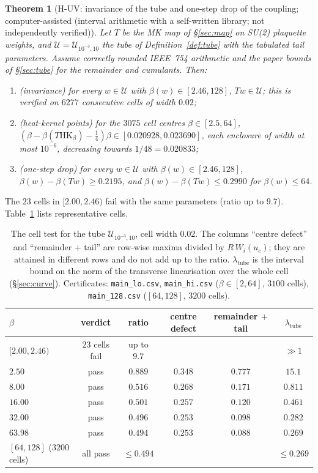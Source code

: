 \documentclass[11pt,a4paper]{article}
\newtheorem{theorem}{Theorem}[section]
\theoremstyle{definition}
\theoremstyle{remark}
\newcommand{\code}[1]{\texttt{#1}}
\newcommand{\HK}{\mathrm{HK}}
\newcommand{\cU}{\mathcal{U}}
\newcommand{\IA}{computer-assisted (interval arithmetic with a self-written library; not independently verified)}
\begin{document}
\begin{theorem}[H-UV: invariance of the tube and one-step drop of the coupling; \IA]\label{thm:huv}
Let $T$ be the MK map of \S\ref{sec:map} on SU(2) plaquette weights, and $\cU=\cU_{10^{-3},10}$ the tube of Definition~\ref{def:tube} with the tabulated tail parameters.
Assume correctly rounded IEEE~754 arithmetic and the paper bounds of \S\ref{sec:tube} for the remainder and cumulants.
Then:
\begin{enumerate}[label=(\roman*)]
\item (invariance) for every $w\in\cU$ with $\beta(w)\in[2.46,128]$, $Tw\in\cU$; this is verified on $6277$ consecutive cells of width $0.02$;
\item (heat-kernel points) for the $3075$ cell centres $\beta\in[2.5,64]$, $(\beta-\beta(T\HK_\beta)-\tfrac14)\beta\in[0.020928,0.023690]$, each enclosure of width at most $10^{-6}$, decreasing towards $1/48=0.020833$;
\item (one-step drop) for every $w\in\cU$ with $\beta(w)\in[2.46,128]$, $\beta(w)-\beta(Tw)\ge0.2195$, and $\beta(w)-\beta(Tw)\le0.2990$ for $\beta(w)\le64$.
\end{enumerate}
\end{theorem}
The $23$ cells in $[2.00,2.46)$ fail with the same parameters (ratio up to $9.7$).
Table~\ref{tab:cells} lists representative cells.

\begin{table}[ht]\centering\small
\begin{tabular}{lccccc}
\toprule
$\beta$ & verdict & ratio & centre defect & remainder $+$ tail & $\lambda_{\mathrm{tube}}$ \\
\midrule
$[2.00,2.46)$ & $23$ cells fail & up to $9.7$ & & & $\gg1$ \\
$2.50$ & pass & $0.889$ & $0.348$ & $0.777$ & $15.1$ \\
$8.00$ & pass & $0.516$ & $0.268$ & $0.171$ & $0.811$ \\
$16.00$ & pass & $0.501$ & $0.257$ & $0.120$ & $0.461$ \\
$32.00$ & pass & $0.496$ & $0.253$ & $0.098$ & $0.282$ \\
$63.98$ & pass & $0.494$ & $0.253$ & $0.088$ & $0.269$ \\
$[64,128]$ ($3200$ cells) & all pass & $\le0.494$ & & & $\le0.269$ \\
\bottomrule
\end{tabular}
\caption{The cell test for the tube $\cU_{10^{-3},10}$, cell width $0.02$. The columns ``centre defect'' and ``remainder $+$ tail'' are row-wise maxima divided by $R\,W_i(u_c)$; they are attained in different rows and do not add up to the ratio. $\lambda_{\mathrm{tube}}$ is the interval bound on the norm of the transverse linearisation over the whole cell (\S\ref{sec:curve}). Certificates: \code{main\_lo.csv}, \code{main\_hi.csv} ($\beta\in[2,64]$, $3100$ cells), \code{main\_128.csv} ($[64,128]$, $3200$ cells).}\label{tab:cells}
\end{table}
\end{document}
